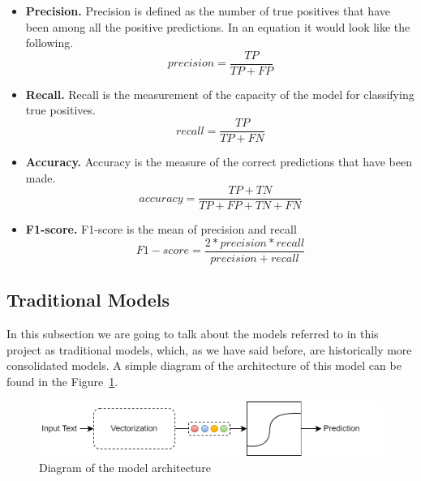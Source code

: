 \begin{itemize}
    \item \textbf{Precision.} Precision is defined as the number of true positives that have been among all the positive predictions. In an equation it would look like the following.
    \begin{equation}
        precision = \frac{TP}{TP + FP} 
    \end{equation}
    \item \textbf{Recall.} Recall is the measurement of the capacity of the model for classifying true positives.
    \begin{equation}
        recall = \frac{TP}{TP + FN} 
    \end{equation}
    \item \textbf{Accuracy.} Accuracy is the measure of the correct predictions that have been made.
    \begin{equation}
        accuracy = \frac{TP + TN}{TP + FP + TN + FN} 
    \end{equation}
    \item \textbf{F1-score.} F1-score is the mean of precision and recall
    \begin{equation}
        F1-score = \frac{2 * precision * recall}{precision + recall} 
    \end{equation}
    
\end{itemize}

\label{sec:models}
\subsection{Traditional Models}

In this subsection we are going to talk about the models referred to in this project as traditional models, which, as we have said before, are historically more consolidated models. A simple diagram of the architecture of this model can be found in the Figure~\ref{fig:modelarch}.


\begin{figure}[!htp]
    \centering
    \includegraphics[scale=0.4]{img/detection/ModelArchitecture.png}
    \caption{Diagram of the model architecture}
    \label{fig:modelarch}
\end{figure}

